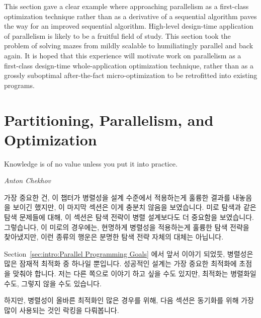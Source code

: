 This section gave a clear example where approaching parallelism
as a first-class optimization technique rather than as a derivative of a
sequential algorithm paves the way for an improved sequential algorithm.
High-level design-time application of parallelism is likely to be a
fruitful field of study.
This section took the problem of solving mazes from mildly scalable
to humiliatingly parallel and back again.
It is hoped that this experience will motivate work on parallelism
as a first-class design-time whole-application optimization technique,
rather than as a grossly suboptimal after-the-fact micro-optimization
to be retrofitted into existing programs.

\fi

\section{Partitioning, Parallelism, and Optimization}
\label{sec:SMPdesign:Partitioning, Parallelism, and Optimization}
%
\epigraph{Knowledge is of no value unless you put it into practice.}
	 {\emph{Anton Chekhov}}

가장 중요한 건, 이 챕터가 병렬성을 설계 수준에서 적용하는게 훌륭한 결과를
내놓음을 보이긴 했지만, 이 마지막 섹션은 이게 충분치 않음을 보였습니다.
미로 탐색과 같은 탐색 문제들에 대해, 이 섹션은 탐색 전략이 병렬 설계보다도 더
중요함을 보였습니다.
그렇습니다, 이 미로의 경우에는, 현명하게 병렬성을 적용하는게 훌륭한 탐색 전략을
찾아냈지만, 이런 종류의 행운은 분명한 탐색 전략 자체의 대체는 아닙니다.

Section~\ref{sec:intro:Parallel Programming Goals} 에서 앞서 이야기 되었듯,
병렬성은 많은 잠재적 최적화 중 하나일 뿐입니다.
성공적인 설계는 가장 중요한 최적화에 초점을 맞춰야 합니다.
저는 다른 쪽으로 이야기 하고 싶을 수도 있지만, 최적화는 병렬화일 수도, 그렇지
않을 수도 있습니다.

하지만, 병렬성이 올바른 최적화인 많은 경우를 위해, 다음 섹션은 동기화를 위해
가장 많이 사용되는 것인 락킹을 다뤄봅니다.

